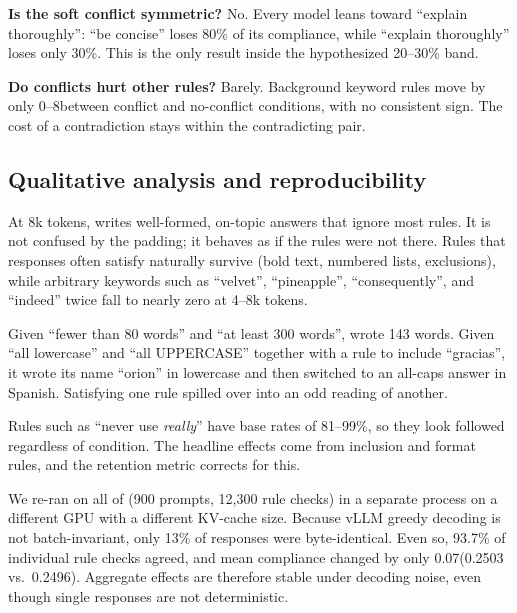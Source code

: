 {\bf Is the soft conflict symmetric?}
No.
Every model leans toward ``explain thoroughly'': ``be concise'' loses 80\% of its compliance, while ``explain thoroughly'' loses only 30\%.
This is the only result inside the hypothesized 20--30\% band.

{\bf Do conflicts hurt other rules?}
Barely.
Background keyword rules move by only 0--8\pp between conflict and no-conflict conditions, with no consistent sign.
The cost of a contradiction stays within the contradicting pair.

\subsection{Qualitative analysis and reproducibility}
\label{sec:qualitative}

At 8k tokens, \qseven writes well-formed, on-topic answers that ignore most rules.
It is not confused by the padding; it behaves as if the rules were not there.
Rules that responses often satisfy naturally survive (bold text, numbered lists, exclusions), while arbitrary keywords such as ``velvet'', ``pineapple'', ``consequently'', and ``indeed'' twice fall to nearly zero at 4--8k tokens.

Given ``fewer than 80 words'' and ``at least 300 words'', \qseven wrote 143 words.
Given ``all lowercase'' and ``all UPPERCASE'' together with a rule to include ``gracias'', it wrote its name ``orion'' in lowercase and then switched to an all-caps answer in Spanish.
Satisfying one rule spilled over into an odd reading of another.

Rules such as ``never use {\em really}'' have base rates of 81--99\%, so they look followed regardless of condition.
The headline effects come from inclusion and format rules, and the retention metric corrects for this.

We re-ran \qonefive on all of \expA (900 prompts, 12{,}300 rule checks) in a separate process on a different GPU with a different KV-cache size.
Because vLLM greedy decoding is not batch-invariant, only 13\% of responses were byte-identical.
Even so, 93.7\% of individual rule checks agreed, and mean compliance changed by only 0.07\pp (0.2503 vs.\ 0.2496).
Aggregate effects are therefore stable under decoding noise, even though single responses are not deterministic.
